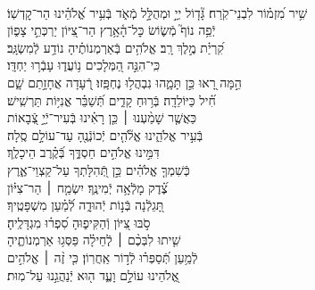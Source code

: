 \documentclass[twoside, openany, parskip=half, 11pt]{book}
\begin{document}
\\
\vspace{-1.5\baselineskip}
%
\begin{narrow}
שִׁ֥יר מִ֝זְמ֗וֹר לִבְנֵי־קֹֽרַח׃ \hfill \break
גָּ֘ד֤וֹל יְיָ֣ וּמְהֻלָּ֣ל מְֿאֹ֑ד \hfill בְּֿעִ֥יר אֱ֝לֹהֵ֗ינוּ הַר־קׇדְשֽׁוֹ׃ \\
יְֿפֵ֥ה נוֹף֮ מְֿשׂ֢וֹשׂ כׇּל־הָ֫אָ֥רֶץ \hfill הַר־צִ֭יּוֹן יַרְכְּתֵ֣י צָפ֑וֹן \\ קִ֝רְיַ֗ת מֶ֣לֶךְ רָֽב׃ \hfill
אֱלֹהִ֥ים בְּֿאַרְמְנוֹתֶ֗יהָ נוֹדַ֥ע לְֿמִשְׂגָּֽב׃ \\
כִּֽי־הִנֵּ֣ה הַ֭מְּלָכִים נ֥וֹעֲד֑וּ \hfill עָבְֿר֥וּ יַחְדָּֽו׃ \\
הֵ֣מָּה רָ֭אוּ כֵּ֣ן תָּמָ֑הוּ נִבְהֲל֥וּ נֶחְפָּֽזוּ׃ \hfill
רְֿ֭עָדָה אֲחָזָ֣תַם שָׁ֑ם \\ חִ֗֝יל כַּיּוֹלֵדָֽה׃ \hfill
בְּֿר֥וּחַ קָדִ֑ים תְּֿ֝שַׁבֵּ֗ר אֳנִיּ֥וֹת תַּרְשִֽׁישׁ׃ \\
כַּאֲשֶׁ֤ר שָׁמַ֨עְנוּ ׀ כֵּ֤ן רָאִ֗ינוּ \hfill בְּֿעִיר־יְֿיָ֣ צְֿ֭בָאוֹת \\ בְּֿעִ֣יר אֱלֹהֵ֑ינוּ \hfill אֱלֹ֘הִ֤ים יְֿכוֹנְֿנֶ֖הָ עַד־עוֹלָ֣ם סֶֽלָה׃ \\
דִּמִּ֣ינוּ אֱלֹהִ֣ים חַסְדֶּ֑ךָ \hfill בְּֿ֝קֶ֗רֶב הֵיכָלֶֽךָ׃ \\
כְּֿשִׁמְךָ֤ אֱלֹהִ֗ים \hfill כֵּ֣ן תְּֿ֭הִלָּתְךָ עַל־קַצְוֵי־אֶ֑רֶץ \\ צֶ֗֝דֶק מָלְֿאָ֥ה יְֿמִינֶֽךָ׃ \hfill
יִשְׂמַ֤ח ׀ הַר־צִיּ֗וֹן \\ תָּ֭גֵלְֿנָה בְּֿנ֣וֹת יְֿהוּדָ֑ה \hfill לְֿ֝מַ֗עַן מִשְׁפָּטֶֽיךָ׃ \\
סֹ֣בּוּ צִ֭יּוֹן וְֿהַקִּיפ֑וּהָ \hfill סִ֝פְר֗וּ מִגְדָּלֶֽיהָ׃ \\
שִׁ֤יתוּ לִבְּכֶ֨ם ׀ לְֽֿחֵילָ֗ה \hfill פַּסְּג֥וּ אַרְמְנוֹתֶ֑יהָ \\ לְֿמַ֥עַן תְּֿ֝סַפְּר֗וּ לְֿד֣וֹר אַֽחֲרֽוֹן׃ \hfill
כִּ֤י זֶ֨ה ׀ אֱלֹהִ֣ים \\ אֱ֭לֹהֵינוּ עוֹלָ֣ם \hfill וָעֶ֑ד ה֖וּא יְֿנַהֲגֵ֣נוּ עַל־מֽוּת׃
\end{narrow}

\enlargethispage{\baselineskip}
\end{document}
